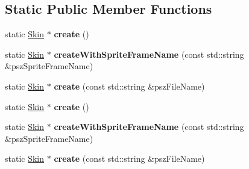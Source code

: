 \subsection*{Static Public Member Functions}
\begin{DoxyCompactItemize}
\item 
\mbox{\label{classcocostudio_1_1Skin_a6190338d21e7bf0aff3e62e3c65d0402}} 
static \hyperlink{classcocostudio_1_1Skin}{Skin} $\ast$ {\bfseries create} ()
\item 
\mbox{\label{classcocostudio_1_1Skin_aff7ab346d065a5b5fb67cdbce032a8dd}} 
static \hyperlink{classcocostudio_1_1Skin}{Skin} $\ast$ {\bfseries create\+With\+Sprite\+Frame\+Name} (const std\+::string \&psz\+Sprite\+Frame\+Name)
\item 
\mbox{\label{classcocostudio_1_1Skin_a82518499b4067e4977d0c928bd740786}} 
static \hyperlink{classcocostudio_1_1Skin}{Skin} $\ast$ {\bfseries create} (const std\+::string \&psz\+File\+Name)
\item 
\mbox{\label{classcocostudio_1_1Skin_ad6f90b54b4b73ed9db8561a4f5d3b667}} 
static \hyperlink{classcocostudio_1_1Skin}{Skin} $\ast$ {\bfseries create} ()
\item 
\mbox{\label{classcocostudio_1_1Skin_afbd2f279bfdb5732757e42449977e865}} 
static \hyperlink{classcocostudio_1_1Skin}{Skin} $\ast$ {\bfseries create\+With\+Sprite\+Frame\+Name} (const std\+::string \&psz\+Sprite\+Frame\+Name)
\item 
\mbox{\label{classcocostudio_1_1Skin_aad0386495c4c03c75dec52b90b43394d}} 
static \hyperlink{classcocostudio_1_1Skin}{Skin} $\ast$ {\bfseries create} (const std\+::string \&psz\+File\+Name)
\end{DoxyCompactItemize}
